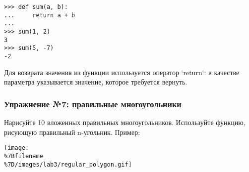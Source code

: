 \begin{verbatim}
>>> def sum(a, b):
...     return a + b
...
>>> sum(1, 2)
3
>>> sum(5, -7)
-2
\end{verbatim}

Для возврата значения из функции используется оператор `return`: в
качестве параметра указывается значение, которое требуется вернуть.

\subsubsection{Упражнение №7: правильные
многоугольники}\label{ux443ux43fux440ux430ux436ux43dux435ux43dux438ux435-7-ux43fux440ux430ux432ux438ux43bux44cux43dux44bux435-ux43cux43dux43eux433ux43eux443ux433ux43eux43bux44cux43dux438ux43aux438}

Нарисуйте 10 вложенных правильных многоугольников. Используйте функцию,
рисующую правильный n-угольник. Пример:

\texttt{[image: \\\%7Bfilename\\\%7D/images/lab3/regular\_polygon.gif]}

\begin{Shaded}
\begin{Highlighting}[]
 
 

 
    \OperatorTok{=} \OperatorTok{*}\OperatorTok{*}\OperatorTok{/}
    \OperatorTok{=} \OperatorTok{*}\NormalTok{(}\OperatorTok{/}
    \OperatorTok{-}\OperatorTok{/}\NormalTok{)}

      
        \OperatorTok{-}

\OperatorTok{=} 
\OperatorTok{=} 


  \NormalTok{(}\NormalTok{):}
    \OperatorTok{=} \OperatorTok{*}\NormalTok{(}\OperatorTok{/}

    \OperatorTok{-}\OperatorTok{/}\NormalTok{)}
    \NormalTok{)}

    \OperatorTok{+=} 
    \OperatorTok{+=} 
\end{Highlighting}
\end{Shaded}

